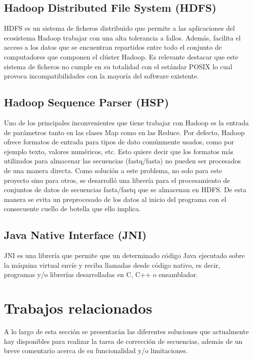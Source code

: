 \documentclass[conference]{IEEEtran}
\begin{document}
\subsection{Hadoop Distributed File System (HDFS)}
HDFS\cite{hadoop_hdfs} es un sistema de ficheros distribuido que permite a las aplicaciones del ecosistema Hadoop trabajar con una alta tolerancia a fallos. Además, facilita el acceso a los datos que se encuentran repartidos entre todo el conjunto de computadores que componen el clúster Hadoop. Es relevante destacar que este sistema de ficheros no cumple en su totalidad con el estándar POSIX lo cual provoca incompatibilidades con la mayoría del software existente.

\subsection{Hadoop Sequence Parser (HSP)}
Uno de los principales inconvenientes que tiene trabajar con Hadoop es la entrada de parámetros tanto en las clases Map como en las Reduce. Por defecto, Hadoop ofrece formatos de entrada para tipos de dato comúnmente usados, como por ejemplo texto, valores numéricos, etc. Esto quiere decir que los formatos más utilizados para almacenar las secuencias (fastq/fasta) no pueden ser procesados de una manera directa. Como solución a este problema, no solo para este proyecto sino para otros, se desarrolló una librería para el procesamiento de conjuntos de datos de secuencias fasta/fastq que se almacenan en HDFS. De esta manera se evita un preprocesado de los datos al inicio del programa con el consecuente cuello de botella que ello implica.

\subsection{Java Native Interface (JNI)}
JNI\cite{jni} es una librería que permite que un determinado código Java ejecutado sobre la máquina virtual envíe y reciba llamadas desde código nativo, es decir, programas y/o librerías desarrolladas en C, C++ o ensamblador.

\section{Trabajos relacionados}

A lo largo de esta sección se presentarán las diferentes soluciones que actualmente hay disponibles para realizar la tarea de corrección de secuencias, además de un breve comentario acerca de su funcionalidad y/o limitaciones.
\end{document}
